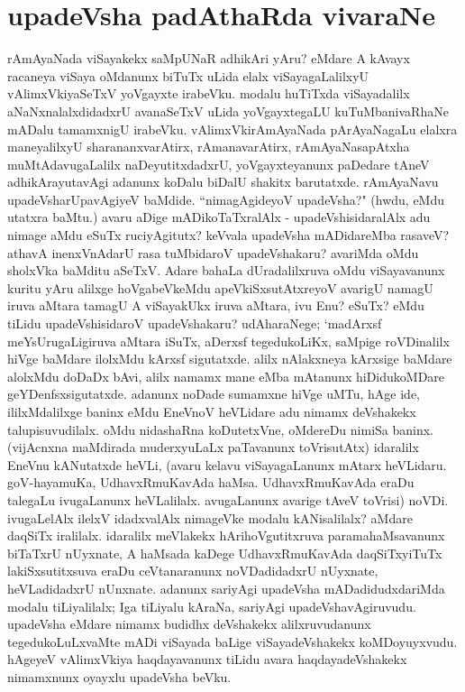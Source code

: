 \section*{upadeVsha padAthaRda vivaraNe} 

rAmAyaNada viSayakekx saMpUNaR adhikAri yAru? eMdare A kAvayx racaneya viSaya oMdanunx biTuTx uLida elalx viSayagaLalilxyU vAlimxVkiyaSeTxV yoVgayxte irabeVku. modalu huTiTxda viSayadalilx aNaNxnalalxdidadxrU avanaSeTxV uLida yoVgayxtegaLU kuTuMbanivaRhaNe mADalu tamamxnigU irabeVku. vAlimxVkirAmAyaNada pArAyaNagaLu elalxra maneyalilxyU sharananxvarAtirx, rAmanavarAtirx, rAmAyaNasapAtxha muMtAdavugaLalilx naDeyutitxdadxrU, yoVgayxteyanunx paDedare tAneV adhikArayutavAgi adanunx koDalu biDalU shakitx barutatxde. rAmAyaNavu upadeVsharUpavAgiyeV baMdide. ``nimagAgideyoV upadeVsha?" (hwdu, eMdu utatxra baMtu.) avaru aDige mADikoTaTxralAlx - upadeVshisidaralAlx adu nimage aMdu eSuTx ruciyAgitutx? keVvala upadeVsha mADidareMba rasaveV? athavA inenxVnAdarU rasa tuMbidaroV upadeVshakaru? avariMda oMdu sholxVka baMditu aSeTxV. Adare bahaLa dUradalilxruva oMdu viSayavanunx kuritu yAru alilxge hoVgabeVkeMdu apeVkiSxsutAtxreyoV avarigU namagU iruva aMtara tamagU A viSayakUkx iruva aMtara, ivu Enu? eSuTx? eMdu tiLidu upadeVshisidaroV upadeVshakaru? udAharaNege; `madArxsf meYsUrugaLigiruva aMtara iSuTx, aDerxsf tegedukoLiKx, saMpige roVDinalilx hiVge baMdare ilolxMdu kArxsf sigutatxde. alilx nAlakxneya kArxsige baMdare alolxMdu doDaDx bAvi, alilx namamx mane eMba mAtanunx hiDidukoMDare geYDenfsxsigutatxde. adanunx noDade sumamxne hiVge uMTu, hAge ide, ililxMdalilxge baninx eMdu EneVnoV heVLidare adu nimamx deVshakekx talupisuvudilalx. oMdu nidashaRna koDutetxVne, oMdereDu nimiSa baninx. (vijAcnxna maMdirada muderxyuLaLx paTavanunx toVrisutAtx) idaralilx EneVnu kANutatxde heVLi, (avaru kelavu viSayagaLanunx mAtarx heVLidaru. goV-hayamuKa, UdhavxRmuKavAda haMsa. UdhavxRmuKavAda eraDu talegaLu ivugaLanunx heVLalilalx. avugaLanunx avarige tAveV toVrisi) noVDi. ivugaLelAlx ilelxV idadxvalAlx nimageVke modalu kANisalilalx? aMdare daqSiTx iralilalx. idaralilx meVlakekx hArihoVgutitxruva paramahaMsavanunx biTaTxrU nUyxnate, A haMsada kaDege UdhavxRmuKavAda daqSiTxyiTuTx lakiSxsutitxsuva eraDu ceVtanaranunx noVDadidadxrU nUyxnate, heVLadidadxrU nUnxnate. adanunx sariyAgi upadeVsha mADadidudxdariMda modalu tiLiyalilalx; Iga tiLiyalu kAraNa, sariyAgi upadeVshavAgiruvudu. upadeVsha eMdare nimamx budidhx deVshakekx alilxruvudanunx tegedukoLuLxvaMte mADi viSayada baLige viSayadeVshakekx koMDoyuyxvudu. hAgeyeV vAlimxVkiya haqdayavanunx tiLidu avara haqdayadeVshakekx nimamxnunx oyayxlu upadeVsha beVku. 


